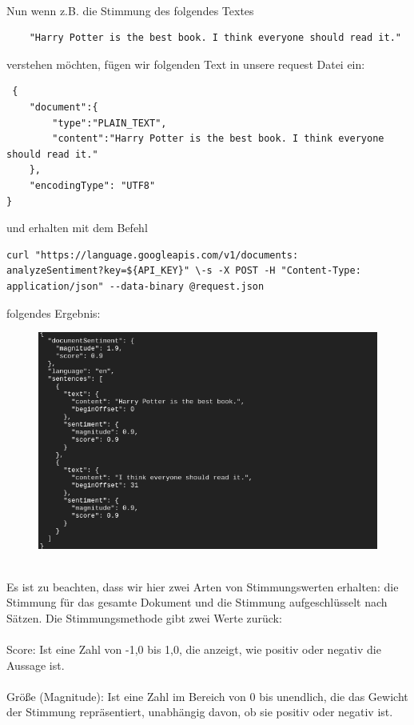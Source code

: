 \documentclass[12pt,a4paper]{article}
\begin{document}
\ \\
Nun wenn z.B. die Stimmung des folgendes Textes
\begin{verbatim}
	"Harry Potter is the best book. I think everyone should read it."
\end{verbatim}
verstehen möchten, fügen wir folgenden Text in unsere request Datei ein:
\begin{verbatim}
 {
	"document":{
		"type":"PLAIN_TEXT",
		"content":"Harry Potter is the best book. I think everyone should read it."
	},
	"encodingType": "UTF8"
}
\end{verbatim}
und erhalten mit dem Befehl
\begin{verbatim}
curl "https://language.googleapis.com/v1/documents:
analyzeSentiment?key=${API_KEY}" \-s -X POST -H "Content-Type: 
application/json" --data-binary @request.json
\end{verbatim}
folgendes Ergebnis:
\newpage
\begin{figure}[h!]
	\centering
	\includegraphics[width=0.7\linewidth]{../images/sentiment}
	\label{fig:sentiment}
\end{figure}
\ \\
Es ist zu beachten, dass wir hier zwei Arten von Stimmungswerten erhalten: die Stimmung für das gesamte Dokument und die Stimmung aufgeschlüsselt nach Sätzen. Die Stimmungsmethode gibt zwei Werte zurück:
\\ \\
Score: Ist eine Zahl von -1,0 bis 1,0, die anzeigt, wie positiv oder negativ die Aussage ist.
\\ \\
Größe (Magnitude): Ist eine Zahl im Bereich von 0 bis unendlich, die das Gewicht der Stimmung repräsentiert, unabhängig davon, ob sie positiv oder negativ ist.









\newpage
\
\newpage
\thispagestyle{empty}
\printbibliography
\end{document}
